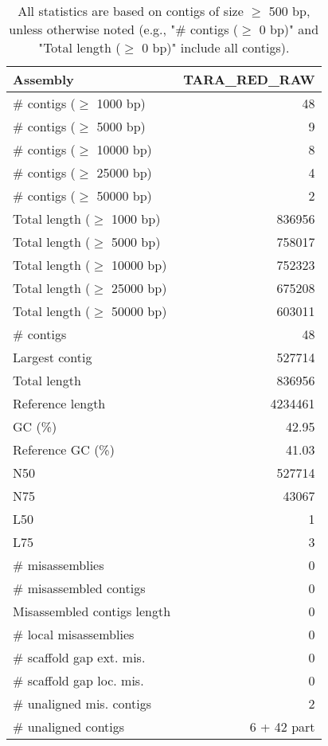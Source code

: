 \documentclass[12pt,a4paper]{article}
\begin{document}
\begin{table}[ht]
\begin{center}
\caption{All statistics are based on contigs of size $\geq$ 500 bp, unless otherwise noted (e.g., "\# contigs ($\geq$ 0 bp)" and "Total length ($\geq$ 0 bp)" include all contigs).}
\begin{tabular}{|l*{1}{|r}|}
\hline
Assembly & TARA\_RED\_RAW \\ \hline
\# contigs ($\geq$ 1000 bp) & 48 \\ \hline
\# contigs ($\geq$ 5000 bp) & 9 \\ \hline
\# contigs ($\geq$ 10000 bp) & 8 \\ \hline
\# contigs ($\geq$ 25000 bp) & 4 \\ \hline
\# contigs ($\geq$ 50000 bp) & 2 \\ \hline
Total length ($\geq$ 1000 bp) & 836956 \\ \hline
Total length ($\geq$ 5000 bp) & 758017 \\ \hline
Total length ($\geq$ 10000 bp) & 752323 \\ \hline
Total length ($\geq$ 25000 bp) & 675208 \\ \hline
Total length ($\geq$ 50000 bp) & 603011 \\ \hline
\# contigs & 48 \\ \hline
Largest contig & 527714 \\ \hline
Total length & 836956 \\ \hline
Reference length & 4234461 \\ \hline
GC (\%) & 42.95 \\ \hline
Reference GC (\%) & 41.03 \\ \hline
N50 & 527714 \\ \hline
N75 & 43067 \\ \hline
L50 & 1 \\ \hline
L75 & 3 \\ \hline
\# misassemblies & 0 \\ \hline
\# misassembled contigs & 0 \\ \hline
Misassembled contigs length & 0 \\ \hline
\# local misassemblies & 0 \\ \hline
\# scaffold gap ext. mis. & 0 \\ \hline
\# scaffold gap loc. mis. & 0 \\ \hline
\# unaligned mis. contigs & 2 \\ \hline
\# unaligned contigs & 6 + 42 part \\ \hline

\end{tabular}
\end{center}
\end{table}
\end{document}
